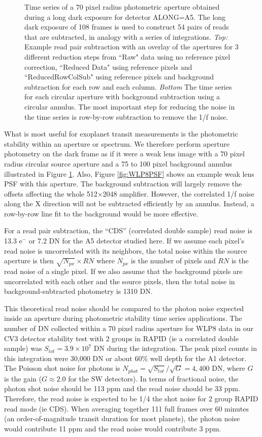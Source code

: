 \documentclass{aastex62}
\begin{document}
\begin{figure}[!hbtp]
\caption{Time series of a 70 pixel radius photometric aperture obtained during a long dark exposure for detector ALONG=A5. The long dark exposure of 108 frames is used to construct 54 pairs of reads that are subtracted, in analogy with a series of integrations.
{\it Top:}  Example read pair subtraction with an overlay of the apertures for 3 different reduction steps from ``Raw" data using no reference pixel correction, ``Reduced Data" using reference pixels and ``ReducedRowColSub" using reference pixels and background subtraction for each row and each column.
{\it Bottom} The time series for each circular aperture with background subtraction using a circular annulus.
The most important step for reducing the noise in the time series is row-by-row subtraction to remove the 1/f noise.
}\label{fig:longDarkPhot}
\end{figure}

What is most useful for exoplanet transit measurements is the photometric stability within an aperture or spectrum.
We therefore perform aperture photometry on the dark frame as if it were a weak lens image with a 70 pixel radius circular source aperture and a 75 to 100 pixel background annulus illustrated in Figure \ref{fig:longDarkPhot}.
Also, Figure \ref{fig:WLP8PSF} shows an example weak lens PSF with this aperture.
The background subtraction will largely remove the offsets affecting the whole 512$\times$2048 amplifier.
However, the correlated 1/f noise along the X direction will not be subtracted efficiently by an annulus.
Instead, a row-by-row line fit to the background would be more effective.

For a read pair subtraction, the ``CDS'' (correlated double sample) read noise is 13.3 e$^-$ or 7.2 DN for the A5 detector studied here.
If we assume each pixel's read noise is uncorrelated with its neighbors, the total noise within the source aperture is then $\sqrt{N_{px}} \times RN $ where $N_{px}$ is the number of pixels and $RN$ is the read noise of a single pixel.
If we also assume that the background pixels are uncorrelated with each other and the source pixels, then the total noise in background-subtracted photometry is 1310 DN.

This theoretical read noise should be compared to the photon noise expected inside an aperture during photometric stability time series applications.
The number of DN collected within a 70 pixel radius aperture for WLP8 data in our CV3 detector stability test with 2 groups in RAPID (ie a correlated double sample) was $S_{tot}=3.9\times 10^7$ DN during the integration.
The peak pixel counts in this integration were 30,000 DN or about 60\% well depth for the A1 detector.
The Poisson shot noise for photons is $N_{phot} = \sqrt{S_{tot}} / \sqrt{G} = 4,400$ DN, where $G$ is the gain ($G \approx 2.0$ for the SW detectors).
In terms of fractional noise, the photon shot noise should be 113 ppm and the read noise should be 33 ppm.
Therefore, the read noise is expected to be 1/4 the shot noise for 2 group RAPID read mode (ie CDS).
When averaging together 111 full frames over 60 minutes (an order-of-magnitude transit duration for most planets), the photon noise would contribute 11 ppm and the read noise would contribute 3 ppm.
\end{document}
